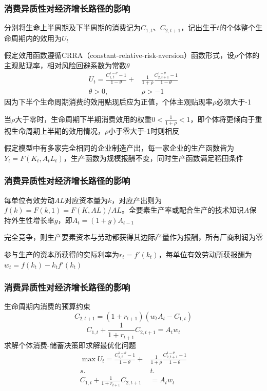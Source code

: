 \documentclass{beamer}
\begin{document}
\begin{frame}
\frametitle{消费异质性对经济增长路径的影响}   
分别将生命上半周期及下半周期的消费记为$C_{1,t}$、$C_{2,t+1}$，记出生于$t$的个体整个生命周期内的效用为$U_{t}$

假定效用函数遵循CRRA（constant-relative-risk-aversion）函数形式，设$\rho$个体的主观贴现率，相对风险回避系数为常数$\theta$
\begin{align*}
U_{t}=\frac{C_{1,t}^{1-\theta}-1}{1-\theta}+&\frac{1}{1+\rho}\frac{C_{2,t+1}^{1-\theta}-1}{1-\theta}\\
\theta>0,\qquad & \rho>-1  
\end{align*}
因为下半个生命周期消费的效用贴现后应为正值，个体主观贴现率$\rho$必须大于-1

当$\rho$大于零时，生命周期下半期消费效用的权重$0<\frac{1}{1+\rho}<1$，即个体将更倾向于重视生命周期上半期的效用情况，$\rho$小于零大于-1时则相反

假定模型中有多家完全相同的企业制造产出，每一家企业的生产函数皆为$Y_{t}=F(K_{t},A_{t}L_{t})$，生产函数为规模报酬不变，同时生产函数满足稻田条件
\end{frame}

\begin{frame}
\frametitle{消费异质性对经济增长路径的影响}
每单位有效劳动$AL$对应资本量为$k$，对应产出则为$f(k)=F(k,1)=F(K,AL)/AL$。全要素生产率或配合生产的技术知识$A$保持外生性增长率$g$，即$A_{t}=(1+g)A_{t-1}$

完全竞争，则生产要素资本与劳动都获得其边际产量作为报酬，所有厂商利润为零

参与生产的资本所获得的实际利率为$r_t=f'(k_t)$，每单位有效劳动所获报酬为$w_t=f(k_t)-k_tf'(k_t)$
\end{frame}

\begin{frame}
\frametitle{消费异质性对经济增长路径的影响}
生命周期内消费的预算约束
\begin{equation*}
C_{2,t+1}=(1+r_{t+1})(w_tA_t-C_{1,t})
\end{equation*}
\begin{equation*}
C_{1,t}+\frac{1}{1+r_{t+1}}C_{2,t+1}=A_{t}w_{t}
\end{equation*}
求解个体消费-储蓄决策即求解最优化问题
\begin{align*}
\max U_{t}=\frac{C_{1,t}^{1-\theta}-1}{1-\theta}+&\frac{1}{1+\rho}\frac{C_{2,t+1}^{1-\theta}-1}{1-\theta}\\
s.&t.\\
C_{1,t}+\frac{1}{1+r_{t+1}}C_{2,t+1}&=A_{t}w_{t}
\end{align*}
\end{frame}
\end{document}
